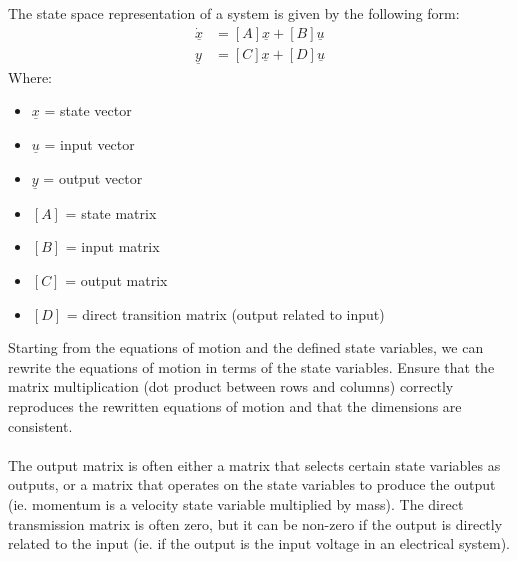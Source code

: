 \documentclass[12pt]{article}
\begin{document}
The state space representation of a system is given by the following form:
\[\begin{aligned}
\dot{\underline{x}} &= [A]{\underline{x}} + [B]\underline{u} \\
\underline{y} &= [C]{\underline{x}} + [D]\underline{u}
\end{aligned}\]
Where:
\begin{itemize}
    \item $\underline{x}$ = state vector
    \item $\underline{u}$ = input vector
    \item $\underline{y}$ = output vector
    \item $[A]$ = state matrix
    \item $[B]$ = input matrix
    \item $[C]$ = output matrix
    \item $[D]$ = direct transition matrix (output related to input)
\end{itemize}
Starting from the equations of motion and the defined state variables, we can rewrite the equations of motion in terms of the state variables. Ensure that the matrix multiplication (dot product between rows and columns) correctly reproduces the rewritten equations of motion and that the dimensions are consistent.\\\\
The output matrix is often either a matrix that selects certain state variables as outputs, or a matrix that operates on the state variables to produce the output (ie. momentum is a velocity state variable multiplied by mass). The direct transmission matrix is often zero, but it can be non-zero if the output is directly related to the input (ie. if the output is the input voltage in an electrical system).
\end{document}
